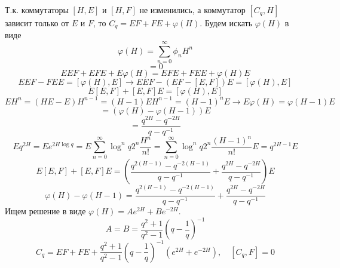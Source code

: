 \documentclass[12pt]{article}
\theoremstyle{definition}
\begin{document}
\begin{enumerate}
\begin{itemize}
        Т.к. коммутаторы $[H,E]$ и $[H,F]$ не изменились, а коммутатор $[C_q,H]$ зависит только от $E$ и $F$, то $C_q=EF+FE+\varphi(H)$. Будем искать $\varphi(H)$ в виде
        \begin{equation}
            \varphi(H)=\sum\limits_{n=0}^\infty\phi_nH^n
        \end{equation}
        \begin{equation}
            [E,C_q]=0
        \end{equation}
        \begin{equation}
            EEF+EFE+E\varphi(H)=EFE+FEE+\varphi(H)E
        \end{equation}
        \begin{equation}
            EEF-FEE=[\varphi(H),E]\rightarrow EEF-(EF-[E,F])E=[\varphi(H),E]
        \end{equation}
        \begin{equation}
            E[E,F]+[E,F]E=[\varphi(H),E]
        \end{equation}
        \begin{equation}
            EH^n=(HE-E)H^{n-1}=(H-1)EH^{n-1}=(H-1)^nE\rightarrow E\varphi(H)=\varphi(H-1)E
        \end{equation}
        \begin{equation}
            [\varphi(H),E]=(\varphi(H)-\varphi(H-1))E    
        \end{equation}
        \begin{equation}
            [E,F]=\frac{q^{2H}-q^{-2H}}{q-q^{-1}}
        \end{equation}
        \begin{equation}
            Eq^{2H}=Ee^{2H\log q}=E\sum\limits_{n=0}^\infty\log^nq2^n\frac{H^n}{n!}=\sum\limits_{n=0}^\infty\log^nq2^n\frac{(H-1)^n}{n!}E=q^{2H-1}E
        \end{equation}
        \begin{equation}
            E[E,F]+[E,F]E=\left(\frac{q^{2(H-1)}-q^{-2(H-1)}}{q-q^{-1}}+\frac{q^{2H}-q^{-2H}}{q-q^{-1}}\right)E
        \end{equation}
        \begin{equation}
            \varphi(H)-\varphi(H-1)=\frac{q^{2(H-1)}-q^{-2(H-1)}}{q-q^{-1}}+\frac{q^{2H}-q^{-2H}}{q-q^{-1}}
        \end{equation}
        Ищем решение в виде $\varphi(H)=Ae^{2H}+Be^{-2H}$.
        \begin{equation}
            A=B=\frac{q^2+1}{q^2-1}\left(q-\frac{1}{q}\right)^{-1}
        \end{equation}
        \begin{equation}
            \boxed{C_q=EF+FE+\frac{q^2+1}{q^2-1}\left(q-\frac{1}{q}\right)^{-1}(e^{2H}+e^{-2H}),\quad [C_q,F]=0}
        \end{equation}
    \end{itemize}
\end{enumerate}
\end{document}
